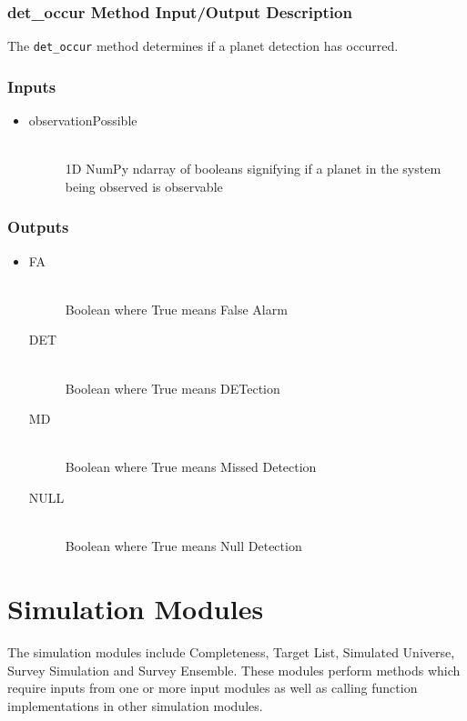 \documentclass[cleanfoot]{asme2ej}
\begin{document}
\subsubsection{det\_occur Method Input/Output Description} \label{sec:detoccurtask}
The \verb+det_occur+ method determines if a planet detection has occurred.

\subsubsection*{Inputs}
\begin{itemize}
    \item 
    \begin{description}
        \item[observationPossible] \hfill \\
        1D NumPy ndarray of booleans signifying if a planet in the system being observed is observable
    \end{description}
\end{itemize}

\subsubsection*{Outputs}
\begin{itemize}
    \item 
    \begin{description}
        \item[FA] \hfill \\
        Boolean where True means False Alarm
        \item[DET] \hfill \\
        Boolean where True means DETection
        \item[MD] \hfill \\
        Boolean where True means Missed Detection
        \item[NULL] \hfill \\
        Boolean where True means Null Detection
    \end{description}
\end{itemize}


\section{Simulation Modules}
The simulation modules include Completeness, Target List, Simulated Universe, Survey Simulation and Survey Ensemble. These modules perform methods which require inputs from one or more input modules as well as calling function implementations in other simulation modules.
\end{document}
